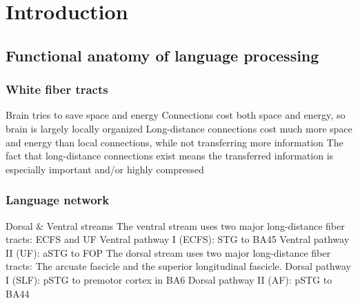 \chapter{Introduction}\label{intro}

\section{Functional anatomy of language processing}

\subsection{White fiber tracts}
Brain tries to save space and energy
Connections cost both space and energy, so brain is largely locally organized
Long-distance connections cost much more space and energy than local connections, while not transferring more information
The fact that long-distance connections exist means the transferred information is especially important and/or highly compressed

\subsection{Language network}
Dorsal \& Ventral streams
The ventral stream uses two major long-distance fiber tracts: ECFS and UF
Ventral pathway I (ECFS): STG to BA45
Ventral pathway II (UF): aSTG to FOP
The dorsal stream uses two major long-distance fiber tracts: The arcuate fascicle and the superior longitudinal fascicle.
Dorsal pathway I (SLF): pSTG to premotor cortex in BA6
Dorsal pathway II (AF): pSTG to BA44

